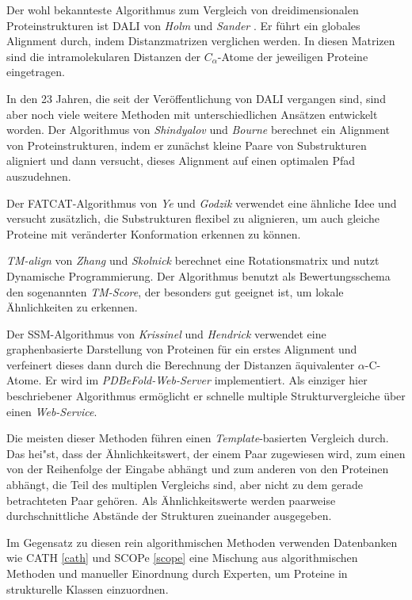 \documentclass{report}
\begin{document}
Der wohl bekannteste Algorithmus zum Vergleich von dreidimensionalen Proteinstrukturen ist DALI von \textit{Holm} und \textit{Sander} \cite{holm1993protein}. Er f\"uhrt ein globales Alignment durch, indem Distanzmatrizen verglichen werden. In diesen Matrizen sind die intramolekularen Distanzen der $C_\alpha$-Atome der jeweiligen Proteine eingetragen.

In den 23 Jahren, die seit der Ver\"offentlichung von DALI vergangen sind, sind aber noch viele weitere Methoden mit unterschiedlichen Ans\"atzen entwickelt worden. Der Algorithmus von \textit{Shindyalov} und \textit{Bourne} \cite{shindyalov1998protein} berechnet ein Alignment von Proteinstrukturen, indem er zun\"achst kleine Paare von Substrukturen aligniert und dann versucht, dieses Alignment auf einen optimalen Pfad auszudehnen.

Der FATCAT-Algorithmus von \textit{Ye} und \textit{Godzik} \cite{fatcat} verwendet eine \"ahnliche Idee und versucht zus\"atzlich, die Substrukturen flexibel zu alignieren, um auch gleiche Proteine mit ver\"anderter Konformation erkennen zu k\"onnen.

\textit{TM-align} von \textit{Zhang} und \textit{Skolnick} \cite{zhangtm} berechnet eine Rotationsmatrix und nutzt Dynamische Programmierung. Der Algorithmus benutzt als Bewertungsschema den sogenannten \textit{TM-Score}, der besonders gut geeignet ist, um lokale \"Ahnlichkeiten zu erkennen.

Der SSM-Algorithmus von \textit{Krissinel} und \textit{Hendrick} \cite{pdbefold} verwendet eine graphenbasierte Darstellung von Proteinen f\"ur ein erstes Alignment und verfeinert dieses dann durch die Berechnung der Distanzen \"aquivalenter $\alpha$-C-Atome. Er wird im \textit{PDBeFold-Web-Server} implementiert. Als einziger hier beschriebener Algorithmus erm\"oglicht er schnelle multiple Strukturvergleiche \"uber einen \textit{Web-Service}.


Die meisten dieser Methoden f\"uhren einen \textit{Template}-basierten Vergleich durch. Das hei"st, dass der \"Ahnlichkeitswert, der einem Paar zugewiesen wird, zum einen von der Reihenfolge der Eingabe abh\"angt und zum anderen von den Proteinen abh\"angt, die Teil des multiplen Vergleichs sind, aber nicht zu dem gerade betrachteten Paar geh\"oren.
Als \"Ahnlichkeitswerte werden paarweise durchschnittliche Abst\"ande der Strukturen zueinander ausgegeben.


Im Gegensatz zu diesen rein algorithmischen Methoden verwenden Datenbanken wie CATH \ref{cath} und SCOPe \ref{scope} eine Mischung aus algorithmischen Methoden und manueller Einordnung durch Experten, um Proteine in strukturelle Klassen einzuordnen.
\end{document}
